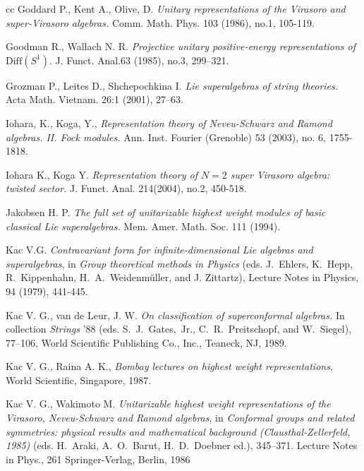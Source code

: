\documentclass[]{amsart}
\newcounter{sec}
\def\Diff{\mathrm{Diff}}
\begin{document}
\begin{thebibliography}{cc}
 Goddard P., Kent A., Olive, D.
{\it Unitary representations of the Virasoro and super-Virasoro algebras.}
Comm. Math. Phys. 103 (1986), no.1, 105-119.

Goodman R., Wallach N. R.
{\it Projective unitary positive-energy representations of $\Diff(S^1)$}. J. Funct. Anal.63 (1985), no.3, 299–321.
 

Grozman P., Leites D., Shchepochkina I.
{\it Lie superalgebras of string theories.} Acta Math. Vietnam. 26:1 (2001),  27--63.

Iohara, K., Koga, Y.,
{\it Representation theory of Neveu-Schwarz and Ramond algebras. II. Fock modules.}
Ann. Inst. Fourier (Grenoble) 53 (2003), no. 6, 1755-1818.

Iohara K., Koga Y.
{\it Representation theory of $N=2$ super Virasoro algebra: twisted sector.}
J. Funct. Anal. 214(2004), no.2, 450-518.




Jakobsen H. P.
{\it The full set of unitarizable highest weight modules of basic classical Lie superalgebras.}
Mem. Amer. Math. Soc. 111 (1994).


Kac V.G.
{\it Contravariant form for infinite-dimensional Lie algebras and 
superalgebras}, in {\it Group theoretical methods in Physics} (eds. J.~Ehlers, K.~Hepp, 
R.~Kippenhahn, H.~A.~Weidenm\"uller, 
and J. Zittartz), 
 Lecture Notes in Physics, 94 (1979), 441-445.

 Kac V. G., van de Leur, J. W.
{\it On classification of superconformal algebras.} In collection {\it Strings} '88 (eds. S.~J.~Gates,~Jr.,
 C.~R.~Preitschopf, and W.~Siegel), 77--106,
World Scientific Publishing Co., Inc., Teaneck, NJ, 1989.

 Kac V. G.,  Raina A. K., {\it Bombay lectures on highest weight representations}, World Scientific, Singapore, 1987.

Kac V. G., Wakimoto M.
{\it Unitarizable highest weight representations of the Virasoro, Neveu-Schwarz and Ramond algebras},
in {\it Conformal groups and related symmetries: physical results and mathematical background (Clausthal-Zellerfeld, 1985)} (eds. H.~Araki, A.~O.~Barut, H.~D.~Doebner ed.), 345–371.
Lecture Notes in Phys., 261
Springer-Verlag, Berlin, 1986


\end{thebibliography}
\end{document}
